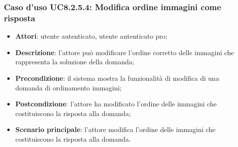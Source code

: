 \subsubsection{Caso d'uso UC8.2.5.4: Modifica ordine immagini come risposta}
\begin{itemize}
	\item\textbf{Attori}: utente autenticato, utente autenticato pro;
	\item\textbf{Descrizione}: l'attore può modificare l'ordine corretto delle immagini che rappresenta la soluzione della domanda;
	\item\textbf{Precondizione}: il sistema mostra la funzionalità di modifica di una domanda di ordinamento immagini; 
	\item \textbf{Postcondizione}: l'attore ha modificato l'ordine delle immagini che costituiscono la risposta alla domanda;
	\item\textbf{Scenario principale}: l'attore modifica l'ordine delle immagini che costituiscono la risposta alla domanda.
\end{itemize}
